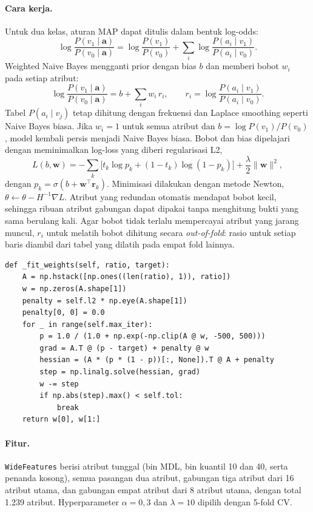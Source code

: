 \paragraph{Cara kerja.}
Untuk dua kelas, aturan MAP dapat ditulis dalam bentuk log-odds:
\[
  \log\frac{P(v_1 \mid \mathbf{a})}{P(v_0 \mid \mathbf{a})}
  = \log\frac{P(v_1)}{P(v_0)} + \sum_{i} \log\frac{P(a_i \mid v_1)}{P(a_i \mid v_0)}.
\]
Weighted Naive Bayes mengganti prior dengan bias $b$ dan memberi bobot $w_i$ pada
setiap atribut:
\[
  \log\frac{P(v_1 \mid \mathbf{a})}{P(v_0 \mid \mathbf{a})}
  = b + \sum_{i} w_i\, r_i,\qquad r_i = \log\frac{P(a_i \mid v_1)}{P(a_i \mid v_0)}.
\]
Tabel $P(a_i \mid v_j)$ tetap dihitung dengan frekuensi dan Laplace smoothing
seperti Naive Bayes biasa. Jika $w_i = 1$ untuk semua atribut dan
$b = \log P(v_1)/P(v_0)$, model kembali persis menjadi Naive Bayes biasa. Bobot
dan bias dipelajari dengan meminimalkan log-loss yang diberi regularisasi L2,
\[
  L(b, \mathbf{w}) = -\sum_{k}\bigl[t_k\log p_k + (1-t_k)\log(1-p_k)\bigr] + \frac{\lambda}{2}\lVert\mathbf{w}\rVert^2,
\]
dengan $p_k = \sigma(b + \mathbf{w}^\top\mathbf{r}_k)$. Minimisasi dilakukan dengan
metode Newton, $\theta \leftarrow \theta - H^{-1}\nabla L$. Atribut yang redundan
otomatis mendapat bobot kecil, sehingga ribuan atribut gabungan dapat dipakai
tanpa menghitung bukti yang sama berulang kali. Agar bobot tidak terlalu
mempercayai atribut yang jarang muncul, $r_i$ untuk melatih bobot dihitung secara
\textit{out-of-fold}: rasio untuk setiap baris diambil dari tabel yang dilatih pada
empat fold lainnya.
\begin{lstlisting}
def _fit_weights(self, ratio, target):
    A = np.hstack([np.ones((len(ratio), 1)), ratio])
    w = np.zeros(A.shape[1])
    penalty = self.l2 * np.eye(A.shape[1])
    penalty[0, 0] = 0.0
    for _ in range(self.max_iter):
        p = 1.0 / (1.0 + np.exp(-np.clip(A @ w, -500, 500)))
        grad = A.T @ (p - target) + penalty @ w
        hessian = (A * (p * (1 - p))[:, None]).T @ A + penalty
        step = np.linalg.solve(hessian, grad)
        w -= step
        if np.abs(step).max() < self.tol:
            break
    return w[0], w[1:]
\end{lstlisting}

\paragraph{Fitur.}
\texttt{WideFeatures} berisi atribut tunggal (bin MDL, bin kuantil 10 dan 40, serta
penanda kosong), semua pasangan dua atribut, gabungan tiga atribut dari 16 atribut
utama, dan gabungan empat atribut dari 8 atribut utama, dengan total 1.239 atribut.
Hyperparameter $\alpha = 0{,}3$ dan $\lambda = 10$ dipilih dengan 5-fold CV.

